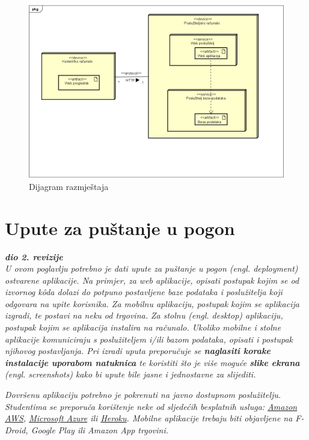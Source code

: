 			\begin{figure}[H]
				\includegraphics[width=\textwidth]{dijagrami/DijagramRazmjestaja.PNG} %
				\centering
				\caption{Dijagram razmještaja}
				\label{fig:diagrazmjestaja}
			\end{figure}
			
			
			\eject 
		
		\section{Upute za puštanje u pogon}
		
			\textbf{\textit{dio 2. revizije}}\\
		
			 \textit{U ovom poglavlju potrebno je dati upute za puštanje u pogon (engl. deployment) ostvarene aplikacije. Na primjer, za web aplikacije, opisati postupak kojim se od izvornog kôda dolazi do potpuno postavljene baze podataka i poslužitelja koji odgovara na upite korisnika. Za mobilnu aplikaciju, postupak kojim se aplikacija izgradi, te postavi na neku od trgovina. Za stolnu (engl. desktop) aplikaciju, postupak kojim se aplikacija instalira na računalo. Ukoliko mobilne i stolne aplikacije komuniciraju s poslužiteljem i/ili bazom podataka, opisati i postupak njihovog postavljanja. Pri izradi uputa preporučuje se \textbf{naglasiti korake instalacije uporabom natuknica} te koristiti što je više moguće \textbf{slike ekrana} (engl. screenshots) kako bi upute bile jasne i jednostavne za slijediti.}
			
			
			 \textit{Dovršenu aplikaciju potrebno je pokrenuti na javno dostupnom poslužitelju. Studentima se preporuča korištenje neke od sljedećih besplatnih usluga: \href{https://aws.amazon.com/}{Amazon AWS}, \href{https://azure.microsoft.com/en-us/}{Microsoft Azure} ili \href{https://www.heroku.com/}{Heroku}. Mobilne aplikacije trebaju biti objavljene na F-Droid, Google Play ili Amazon App trgovini.}
			
			
			\eject 
